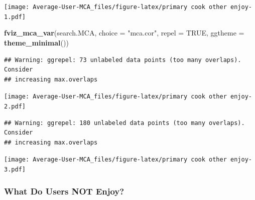 \documentclass[
]{article}
\newenvironment{Shaded}{\begin{snugshade}}{\end{snugshade}}
\newcommand{\DataTypeTok}[1]{\textcolor[rgb]{0.13,0.29,0.53}{#1}}
\newcommand{\KeywordTok}[1]{\textcolor[rgb]{0.13,0.29,0.53}{\textbf{#1}}}
\newcommand{\NormalTok}[1]{#1}
\newcommand{\OtherTok}[1]{\textcolor[rgb]{0.56,0.35,0.01}{#1}}
\newcommand{\StringTok}[1]{\textcolor[rgb]{0.31,0.60,0.02}{#1}}
\begin{document}
\texttt{[image: Average-User-MCA\_files/figure-latex/primary cook other enjoy-1.pdf]}

\begin{Shaded}
\begin{Highlighting}[]
\KeywordTok{fviz_mca_var}\NormalTok{(search.MCA, }\DataTypeTok{choice =} \StringTok{"mca.cor"}\NormalTok{, }\DataTypeTok{repel =} \OtherTok{TRUE}\NormalTok{,}
             \DataTypeTok{ggtheme =} \KeywordTok{theme_minimal}\NormalTok{())}
\end{Highlighting}
\end{Shaded}

\begin{verbatim}
## Warning: ggrepel: 73 unlabeled data points (too many overlaps). Consider
## increasing max.overlaps
\end{verbatim}

\texttt{[image: Average-User-MCA\_files/figure-latex/primary cook other enjoy-2.pdf]}

\begin{Shaded}
\end{Shaded}

\begin{verbatim}
## Warning: ggrepel: 180 unlabeled data points (too many overlaps). Consider
## increasing max.overlaps
\end{verbatim}

\texttt{[image: Average-User-MCA\_files/figure-latex/primary cook other enjoy-3.pdf]}

\hypertarget{what-do-users-not-enjoy-3}{%
\subsubsection{What Do Users NOT
Enjoy?}\label{what-do-users-not-enjoy-3}}
\end{document}
